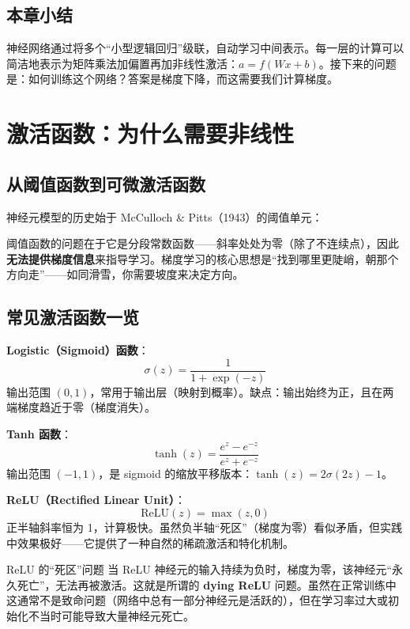 \documentclass[a4paper]{article}
\begin{document}
\subsection{本章小结}

神经网络通过将多个``小型逻辑回归''级联，自动学习中间表示。每一层的计算可以简洁地表示为矩阵乘法加偏置再加非线性激活：$a = f(Wx + b)$。接下来的问题是：如何训练这个网络？答案是梯度下降，而这需要我们计算梯度。


\section{激活函数：为什么需要非线性}

\subsection{从阈值函数到可微激活函数}

神经元模型的历史始于 McCulloch \& Pitts（1943）的阈值单元：





阈值函数的问题在于它是分段常数函数——斜率处处为零（除了不连续点），因此\textbf{无法提供梯度信息}来指导学习。梯度学习的核心思想是``找到哪里更陡峭，朝那个方向走''——如同滑雪，你需要坡度来决定方向。

\subsection{常见激活函数一览}





\textbf{Logistic（Sigmoid）函数}：
$$\sigma(z) = \frac{1}{1 + \exp(-z)}$$
输出范围 $(0, 1)$，常用于输出层（映射到概率）。缺点：输出始终为正，且在两端梯度趋近于零（梯度消失）。

\textbf{Tanh 函数}：
$$\tanh(z) = \frac{e^z - e^{-z}}{e^z + e^{-z}}$$
输出范围 $(-1, 1)$，是 sigmoid 的缩放平移版本：$\tanh(z) = 2\sigma(2z) - 1$。

\textbf{ReLU（Rectified Linear Unit）}：
$$\text{ReLU}(z) = \max(z, 0)$$
正半轴斜率恒为 1，计算极快。虽然负半轴``死区''（梯度为零）看似矛盾，但实践中效果极好——它提供了一种自然的稀疏激活和特化机制。

\begin{warningbox}{ReLU 的``死区''问题}
当 ReLU 神经元的输入持续为负时，梯度为零，该神经元``永久死亡''，无法再被激活。这就是所谓的 \textbf{dying ReLU} 问题。虽然在正常训练中这通常不是致命问题（网络中总有一部分神经元是活跃的），但在学习率过大或初始化不当时可能导致大量神经元死亡。
\end{warningbox}
\end{document}
